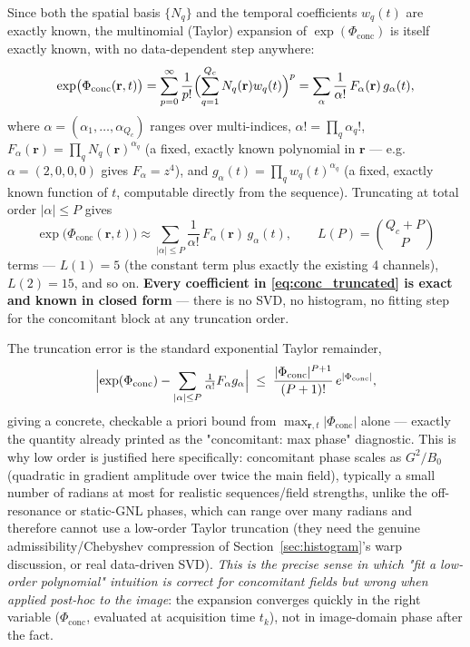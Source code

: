 \documentclass{article}
\begin{document}
Since both the spatial basis $\{N_q\}$ and the temporal coefficients $w_q(t)$ are exactly known,
the multinomial (Taylor) expansion of $\exp(\Phi_{\mathrm{conc}})$ is itself exactly known, with
no data-dependent step anywhere:
\begin{equation}
    \exp\bigl(\Phi_{\mathrm{conc}}(\mathbf{r},t)\bigr)
        = \sum_{p=0}^{\infty} \frac{1}{p!}\Bigl(\sum_{q=1}^{Q_c} N_q(\mathbf{r})w_q(t)\Bigr)^{p}
        = \sum_{\alpha} \frac{1}{\alpha!}\, F_\alpha(\mathbf{r})\, g_\alpha(t),
    \label{eq:conc_multinomial}
\end{equation}
where $\alpha=(\alpha_1,\ldots,\alpha_{Q_c})$ ranges over multi-indices, $\alpha! = \prod_q
\alpha_q!$, $F_\alpha(\mathbf{r}) = \prod_q N_q(\mathbf{r})^{\alpha_q}$ (a fixed, exactly known
polynomial in $\mathbf{r}$ — e.g.\ $\alpha=(2,0,0,0)$ gives $F_\alpha = z^4$), and
$g_\alpha(t) = \prod_q w_q(t)^{\alpha_q}$ (a fixed, exactly known function of $t$, computable
directly from the sequence). Truncating at total order $|\alpha|\le P$ gives
\begin{equation}
    \exp\bigl(\Phi_{\mathrm{conc}}(\mathbf{r},t)\bigr)
        \approx \sum_{|\alpha|\le P} \frac{1}{\alpha!}\, F_\alpha(\mathbf{r})\, g_\alpha(t),
    \qquad L(P) = \binom{Q_c+P}{P}
    \label{eq:conc_truncated}
\end{equation}
terms — $L(1)=5$ (the constant term plus exactly the existing 4 channels), $L(2)=15$, and so on.
\textbf{Every coefficient in \eqref{eq:conc_truncated} is exact and known in closed form} — there
is no SVD, no histogram, no fitting step for the concomitant block at any truncation order.

The truncation error is the standard exponential Taylor remainder,
\begin{equation}
    \Bigl|\exp(\Phi_{\mathrm{conc}}) - \sum_{|\alpha|\le P}\tfrac{1}{\alpha!}F_\alpha g_\alpha\Bigr|
        \;\le\; \frac{|\Phi_{\mathrm{conc}}|^{P+1}}{(P+1)!}\,e^{|\Phi_{\mathrm{conc}}|},
    \label{eq:conc_remainder}
\end{equation}
giving a concrete, checkable a priori bound from $\max_{\mathbf{r},t}|\Phi_{\mathrm{conc}}|$ alone
— exactly the quantity already printed as the "concomitant: max phase" diagnostic. This is why
low order is justified here specifically: concomitant phase scales as $G^2/B_0$ (quadratic in
gradient amplitude over twice the main field), typically a small number of radians at most for
realistic sequences/field strengths, unlike the off-resonance or static-GNL phases, which can
range over many radians and therefore cannot use a low-order Taylor truncation (they need the
genuine admissibility/Chebyshev compression of Section~\ref{sec:histogram}'s warp discussion, or
real data-driven SVD). \emph{This is the precise sense in which "fit a low-order polynomial"
intuition is correct for concomitant fields but wrong when applied post-hoc to the image}: the
expansion converges quickly in the right variable ($\Phi_{\mathrm{conc}}$, evaluated at
acquisition time $t_k$), not in image-domain phase after the fact.
\end{document}
